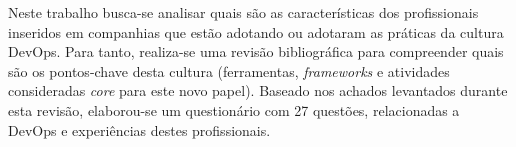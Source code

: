 \documentclass[twoside,english,brazilian]{UNISINOSartigo}
\begin{document}





Neste trabalho busca-se analisar quais são as características dos profissionais inseridos em companhias que estão adotando ou adotaram as práticas da cultura DevOps. Para tanto, realiza-se uma revisão bibliográfica para compreender quais são os pontos-chave desta cultura (ferramentas, \textit{frameworks} e atividades consideradas \textit{core} para este novo papel). Baseado nos achados levantados durante esta revisão, elaborou-se um questionário com 27 questões, relacionadas a DevOps e experiências destes profissionais. 
\end{document}

